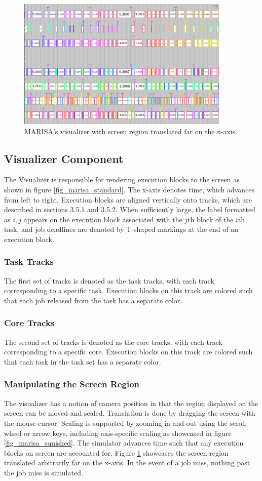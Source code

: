 \documentclass[conference,compsoc]{IEEEtran}
\begin{document}
\begin{figure}
\includegraphics[width=4in]{MARISA_far.png}
\caption{MARISA's visualizer with screen region translated far on the x-axis.}
\label{fig_marisa_far}
\end{figure}

\subsection{Visualizer Component}
The Visualizer is responsible for rendering execution blocks to the screen as shown in figure \ref{fig_marisa_standard}. The x-axis denotes time, which advances from left to right. Execution blocks are aligned vertically onto tracks, which are described in sections 3.5.1 and 3.5.2. When sufficiently large, the label formatted as $i,j$ appears on the execution block associated with the $j$th block of the $i$th task, and job deadlines are denoted by T-shaped markings at the end of an execution block.

\subsubsection{Task Tracks}
The first set of tracks is denoted as the task tracks, with each track corresponding to a specific task. Execution blocks on this track are colored such that each job released from the task has a separate color.

\subsubsection{Core Tracks} The second set of tracks is denoted as the core tracks, with each track corresponding to a specific core. Execution blocks on this track are colored such that each task in the task set has a separate color.

\subsubsection{Manipulating the Screen Region} The visualizer has a notion of camera position in that the region displayed on the screen can be moved and scaled. Translation is done by dragging the screen with the mouse cursor. Scaling is supported by zooming in and out using the scroll wheel or arrow keys, including axis-specific scaling as showcased in figure \ref{fig_marisa_squished}. The simulator advances time such that any execution blocks on screen are accounted for. Figure \ref{fig_marisa_far} showcases the screen region translated arbitrarily far on the x-axis. In the event of a job miss, nothing past the job miss is simulated.
\end{document}
